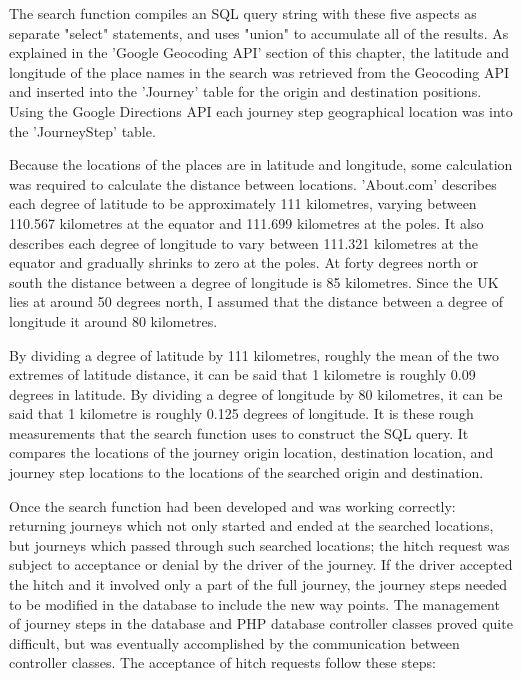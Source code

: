 The search function compiles an SQL query string with these five aspects as separate "select" statements, and uses "union" to accumulate all of the results. As explained in the 'Google Geocoding API' section of this chapter, the latitude and longitude of the place names in the search was retrieved from the Geocoding API and inserted into the 'Journey' table for the origin and destination positions. Using the Google Directions API each journey step geographical location was into the 'Journey\textunderscore Step' table. 

Because the locations of the places are in latitude and longitude, some calculation was required to calculate the distance between locations. 'About.com' describes each degree of latitude to be approximately 111 kilometres, varying between 110.567 kilometres at the equator and 111.699 kilometres at the poles. It also describes each degree of longitude to vary between 111.321 kilometres at the equator and gradually shrinks to zero at the poles\cite{about_com_distances}. At forty degrees north or south the distance between a degree of longitude is 85 kilometres. Since the UK lies at around 50 degrees north, I assumed that the distance between a degree of longitude it around 80 kilometres. 

By dividing a degree of latitude by 111 kilometres, roughly the mean of the two extremes of latitude distance, it can be said that 1 kilometre is roughly 0.09 degrees in latitude. By dividing a degree of longitude by 80 kilometres, it can be said that 1 kilometre is roughly 0.125 degrees of longitude. It is these rough measurements that the search function uses to construct the SQL query. It compares the locations of the journey origin location, destination location, and journey step locations to the locations of the searched origin and destination.

Once the search function had been developed and was working correctly: returning journeys which not only started and ended at the searched locations, but journeys which passed through such searched locations; the hitch request was subject to acceptance or denial by the driver of the journey. If the driver accepted the hitch and it involved only a part of the full journey, the journey steps needed to be modified in the database to include the new way points. The management of journey steps in the database and PHP database controller classes proved quite difficult, but was eventually accomplished by the communication between controller classes. The acceptance of hitch requests follow these steps:


